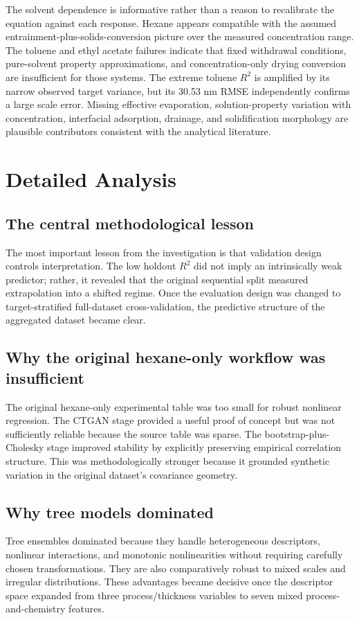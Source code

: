 \documentclass[11pt]{article}
\begin{document}
The solvent dependence is informative rather than a reason to recalibrate the equation against each response. Hexane appears compatible with the assumed entrainment-plus-solids-conversion picture over the measured concentration range. The toluene and ethyl acetate failures indicate that fixed withdrawal conditions, pure-solvent property approximations, and concentration-only drying conversion are insufficient for those systems. The extreme toluene $R^2$ is amplified by its narrow observed target variance, but its 30.53 nm RMSE independently confirms a large scale error. Missing effective evaporation, solution-property variation with concentration, interfacial adsorption, drainage, and solidification morphology are plausible contributors consistent with the analytical literature.

\section{Detailed Analysis}

\subsection{The central methodological lesson}
The most important lesson from the investigation is that validation design controls interpretation. The low holdout $R^2$ did not imply an intrinsically weak predictor; rather, it revealed that the original sequential split measured extrapolation into a shifted regime. Once the evaluation design was changed to target-stratified full-dataset cross-validation, the predictive structure of the aggregated dataset became clear.

\subsection{Why the original hexane-only workflow was insufficient}
The original hexane-only experimental table was too small for robust nonlinear regression. The CTGAN stage provided a useful proof of concept but was not sufficiently reliable because the source table was sparse. The bootstrap-plus-Cholesky stage improved stability by explicitly preserving empirical correlation structure. This was methodologically stronger because it grounded synthetic variation in the original dataset's covariance geometry.

\subsection{Why tree models dominated}
Tree ensembles dominated because they handle heterogeneous descriptors, nonlinear interactions, and monotonic nonlinearities without requiring carefully chosen transformations. They are also comparatively robust to mixed scales and irregular distributions. These advantages became decisive once the descriptor space expanded from three process/thickness variables to seven mixed process-and-chemistry features.
\end{document}
